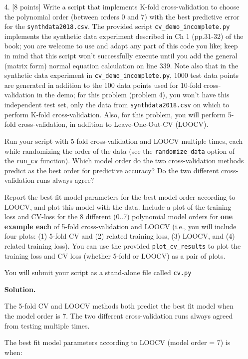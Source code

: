 \documentclass[10pt]{article}
\begin{document}
\begin{itemize}
\item[4.] [8 points]
Write a script that implements K-fold cross-validation to choose the polynomial order (between orders 0 and 7) with the best predictive error for the {\tt synthdata2018.csv}.  The provided script {\tt cv\_demo\_incomplete.py} implements the synthetic data experiment described in Ch 1 (pp.31-32) of the book; you are welcome to use and adapt any part of this code you like; keep in mind that this script won't successfully execute until you add the general (matrix form) normal equation calculation on line 339.
Note also that in the synthetic data experiment in {\tt cv\_demo\_incomplete.py}, 1000 test data points are generated in addition to the 100 data points used for 10-fold cross-validation in the demo; for this problem (problem 4), you won't have this independent test set, only the data from {\tt synthdata2018.csv} on which to perform K-fold cross-validation.  Also, for this problem, you will perform 5-fold cross-validation, in addition to Leave-One-Out-CV (LOOCV).

Run your script with 5-fold cross-validation and LOOCV multiple times, each while randomizing the order of the data (see the {\tt randomize\_data} option of the {\tt run\_cv} function).
Which model order do the two cross-validation methods predict as the best order for predictive accuracy?
Do the two different cross-validation runs always agree?

Report the best-fit model parameters for the best model order according to LOOCV, and plot this model with the data.
Include a plot of the training loss and CV-loss for the 8 different (0..7) polynomial model orders for {\bf one example each} of 5-fold cross-validation and LOOCV (i.e., you will include four plots: (1) 5-fold CV and (2) related training loss, (3) LOOCV, and (4) related training loss).  You can use the provided {\tt plot\_cv\_results} to plot the training loss and CV loss (whether 5-fold or LOOCV) as a pair of plots.

You will submit your script as a stand-alone file called {\tt cv.py}

{\bf Solution.} 

The 5-fold CV and LOOCV methods both predict the best fit model when the model order is 7. The two different cross-validation runs always agreed from testing multiple times. 

The best fit model parameters according to LOOCV (model order = 7) is when:


\end{itemize}
\end{document}
